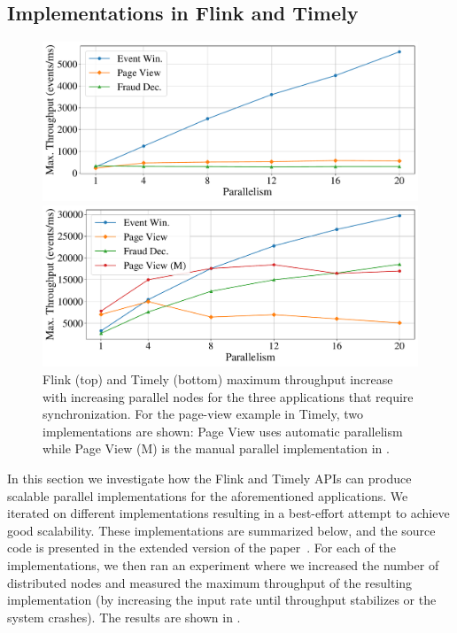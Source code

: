 \subsection{Implementations in Flink and Timely}
\label{dgs:ssec:eval-existing-implementations}

\begin{figure}[t]
  \centering
  \includegraphics[width=0.8\columnwidth]{figures/dgs/flink_max_throughput_scaleup}

  \includegraphics[width=0.8\columnwidth]{figures/dgs/timely_max_throughput_scaleup}
  \caption{
  Flink (top) and Timely (bottom) maximum throughput increase with increasing parallel nodes for the three applications that require synchronization.
  For the page-view example in Timely, two implementations are shown: Page View uses automatic
  parallelism while Page View (M) is the manual parallel implementation
  in .
  }
  \label{dgs:fig:existing-implementations-scaling}
\end{figure}

In this section we investigate how the Flink and Timely APIs can produce scalable parallel implementations for the aforementioned applications.
We iterated on different implementations resulting in a best-effort attempt to achieve good scalability. These implementations are summarized below, and the source code is presented in the extended version of the paper~\cite{flumina-arxiv}.
For each of the implementations, we then ran an experiment where we increased the number of distributed nodes and measured the maximum throughput of the resulting implementation (by increasing the input rate until throughput stabilizes or the system crashes).
The results are shown in .

